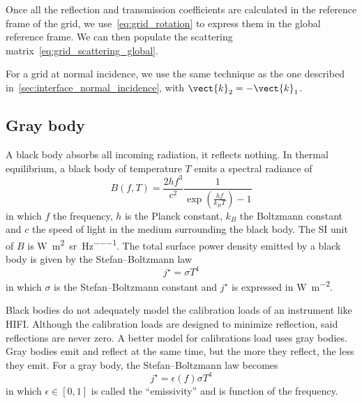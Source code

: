 \begin{refsection}
Once all the reflection and transmission coefficients are calculated in the reference frame of the grid, we use~\cref{eq:grid_rotation} to express them in the global reference frame.
We can then populate the scattering matrix~\cref{eq:grid_scattering_global}.

For a grid at normal incidence, we use the same technique as the one described in~\vref{sec:interface_normal_incidence}, \textit{} with $\vect{k}_2=-\vect{k}_1$.






\subsection{Gray body}
\label{sec:gray_body}
A black body absorbs all incoming radiation, it reflects nothing.
In thermal equilibrium, a black body of temperature $T$ emits a spectral radiance of
\begin{equation}
    B(f, T) =
    \frac{2 h f^3}{c^2}
    \frac{1}{
        \exp \left(
            \frac{h f}{k_B T}
        \right)
        -1
    }
\end{equation}
in which $f$ the frequency, $h$ is the Planck constant, $k_B$ the Boltzmann constant and $c$ the speed of light in the medium surrounding the black body.
The SI unit of $B$ is \si{\watt\per\meter\squared\per\steradian\per\hertz}.
The total surface power density emitted by a black body is given by the Stefan--Boltzmann law
\begin{equation}
    j^\star = \sigma T^4
\end{equation}
in which $\sigma$ is the Stefan--Boltzmann constant and
$j^\star$ is expressed in \si{\watt\per\meter\squared}.

Black bodies do not adequately model the calibration loads of an instrument like HIFI.
Although the calibration loads are designed to minimize reflection, said reflections are never zero.
A better model for calibrations load uses gray bodies.
Gray bodies emit and reflect at the same time,
but the more they reflect, the less they emit.
For a gray body, the Stefan--Boltzmann law becomes
\begin{equation}
    j^\star = \epsilon(f) \sigma T^4
\end{equation}
in which $\epsilon \in [0,1]$ is called the ``emissivity'' and is function of the frequency.


\end{refsection}

